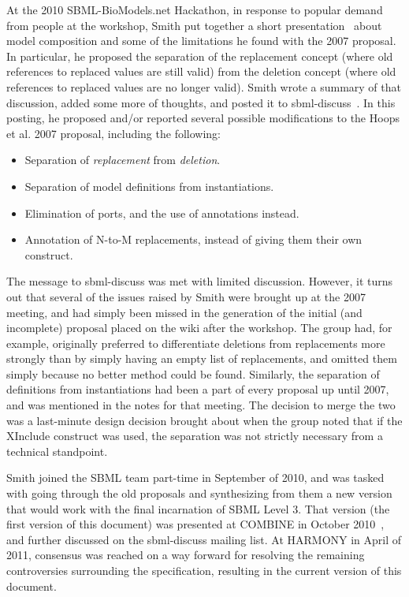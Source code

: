 At the 2010 SBML-BioModels.net Hackathon, in response to popular demand
from people at the workshop, Smith put together a short
presentation~\cite{} about model composition and some of the limitations
he found with the 2007 proposal.  In particular, he proposed the
separation of the replacement concept (where old references to replaced
values are still valid) from the deletion concept (where old references
to replaced values are no longer valid).  Smith wrote a summary of that
discussion, added some more of thoughts, and posted it to
sbml-discuss~\cite{}.  In this posting, he proposed and/or reported
several possible modifications to the Hoops et al. 2007 proposal,
including the following:

\begin{itemize}

\item Separation of \emph{replacement} from \emph{deletion}.

\item Separation of model definitions from instantiations.

\item Elimination of ports, and the use of annotations instead.

\item Annotation of N-to-M replacements, instead of giving them their
  own construct.

\end{itemize}

The message to sbml-discuss was met with limited discussion.  However,
it turns out that several of the issues raised by Smith were brought up
at the 2007 meeting, and had simply been missed in the generation of the
initial (and incomplete) proposal placed on the wiki after the
workshop.  The group had, for example, originally preferred to
differentiate deletions from replacements more strongly than by simply
having an empty list of replacements, and omitted them simply because no
better method could be found.  Similarly, the separation of definitions
from instantiations had been a part of every proposal up until 2007, and
was mentioned in the notes for that meeting.  The decision to merge the
two was a last-minute design decision brought about when the group noted
that if the XInclude construct was used, the separation was not strictly
necessary from a technical standpoint.

Smith joined the SBML team part-time in September of 2010, and was
tasked with going through the old proposals and synthesizing from them a
new version that would work with the final incarnation of SBML Level 3.
That version (the first version of this document) was presented at
COMBINE in October 2010~\cite{}, and further discussed on the
sbml-discuss mailing list.  At HARMONY in April of 2011, consensus was
reached on a way forward for resolving the remaining controversies
surrounding the specification, resulting in the current version of this
document.


